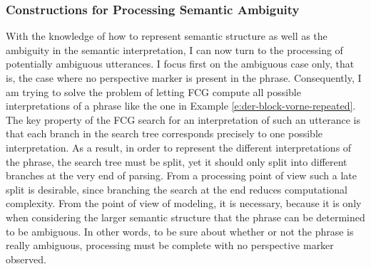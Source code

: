 \subsubsection*{Constructions for Processing Semantic Ambiguity}
With the knowledge of how to represent semantic structure as well as the 
ambiguity in the semantic interpretation, 
I can now turn to the processing of potentially ambiguous utterances.
I focus first on the ambiguous case only, that is, the case where no 
perspective marker is present in the 
phrase. Consequently, I am trying to solve the problem of 
letting FCG compute all possible interpretations of a
phrase like the one in Example \ref{e:der-block-vorne-repeated}. 
The key property of the FCG search for an interpretation 
of such an utterance is that each branch in the search tree corresponds 
precisely to one possible interpretation. As a result,
in order to represent the different interpretations of the phrase, the search tree 
must be split, yet it should only split into different branches at the very end of parsing. 
From a processing point of view such a late split is desirable, since branching the 
search at the end reduces computational complexity. From the point of view of modeling, 
it is necessary, because it is only when considering the larger semantic structure
that the phrase can be determined to be ambiguous. In other words, to be sure about 
whether or not the phrase is really ambiguous, processing must be complete 
with no perspective marker observed.


